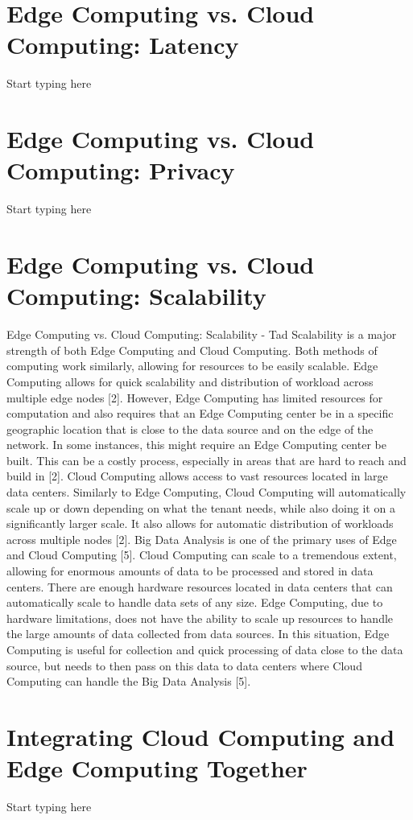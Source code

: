 \documentclass[conference]{IEEEtran}
\begin{document}
\section{Edge Computing vs. Cloud Computing: Latency}
Start typing here

\section{Edge Computing vs. Cloud Computing: Privacy}
Start typing here

\section{Edge Computing vs. Cloud Computing: Scalability}
Edge Computing vs. Cloud Computing: Scalability - Tad
Scalability is a major strength of both Edge Computing and Cloud Computing. Both methods of computing work similarly, allowing for resources to be easily scalable. Edge Computing allows for quick scalability and distribution of workload across multiple edge nodes [2]. However, Edge Computing has limited resources for computation and also requires that an Edge Computing center be in a specific geographic location that is close to the data source and on the edge of the network. In some instances, this might require an Edge Computing center be built. This can be a costly process, especially in areas that are hard to reach and build in [2]. Cloud Computing allows access to vast resources located in large data centers. Similarly to Edge Computing, Cloud Computing will automatically scale up or down depending on what the tenant needs, while also doing it on a significantly larger scale. It also allows for automatic distribution of workloads across multiple nodes [2].
Big Data Analysis is one of the primary uses of Edge and Cloud Computing [5]. Cloud Computing can scale to a tremendous extent, allowing for enormous amounts of data to be processed and stored in data centers. There are enough hardware resources located in data centers that can automatically scale to handle data sets of any size. Edge Computing, due to hardware limitations, does not have the ability to scale up resources to handle the large amounts of data collected from data sources. In this situation, Edge Computing is useful for collection and quick processing of data close to the data source, but needs to then pass on this data to data centers where Cloud Computing can handle the Big Data Analysis [5].

\section{Integrating Cloud Computing and Edge Computing Together}
Start typing here
\end{document}
